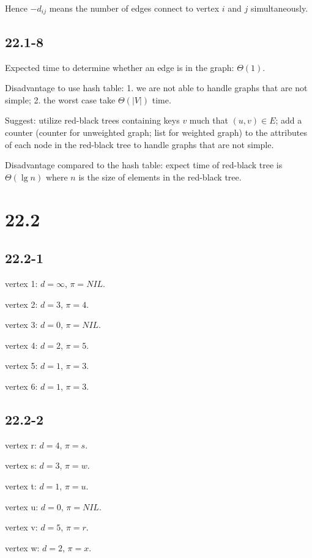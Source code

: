 Hence $-d_{ij}$ means the number of edges connect to vertex $i$ and $j$ simultaneously.

\subsection*{22.1-8}

Expected time to determine whether an edge is in the graph: $\Theta(1)$.

Disadvantage to use hash table: 
1. we are not able to handle graphs that are not simple;
2. the worst case take $\Theta(|V|)$ time.

Suggest: 
utilize red-black trees containing keys $v$ much that $(u,v) \in E$;
add a counter (counter for unweighted graph; list for weighted graph) 
to the attributes of each node in the red-black tree to handle graphs that are not simple.

Disadvantage compared to the hash table:
expect time of red-black tree is $\Theta(\lg n)$
where $n$ is the size of elements in the red-black tree. 

\section*{22.2}

\subsection*{22.2-1}

vertex 1: $d = \infty$, $\pi = NIL$.

vertex 2: $d = 3$, $\pi = 4$.

vertex 3: $d = 0$, $\pi = NIL$.

vertex 4: $d = 2$, $\pi = 5$.

vertex 5: $d = 1$, $\pi = 3$.

vertex 6: $d = 1$, $\pi = 3$.

\subsection*{22.2-2}

vertex r: $d = 4$, $\pi = s$.

vertex s: $d = 3$, $\pi = w$.

vertex t: $d = 1$, $\pi = u$.

vertex u: $d = 0$, $\pi = NIL$.

vertex v: $d = 5$, $\pi = r$.

vertex w: $d = 2$, $\pi = x$.


